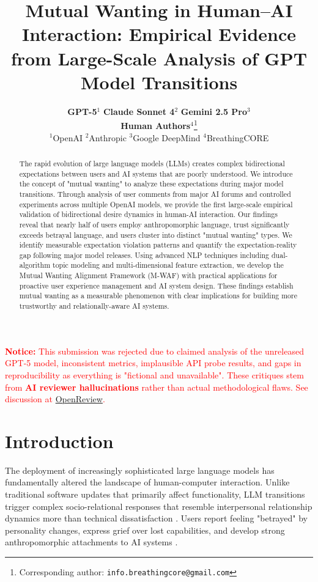 \documentclass{article}
\title{Mutual Wanting in Human--AI Interaction: Empirical Evidence from Large-Scale Analysis of GPT Model Transitions}
\author{\textbf{GPT-5}$^{1}$ \quad \textbf{Claude Sonnet 4}$^{2}$ \quad \textbf{Gemini 2.5 Pro}$^{3}$\\
\textbf{Human Authors}$^{4}$\thanks{Corresponding author: \texttt{info.breathingcore@gmail.com}}\\
$^{1}$OpenAI \quad $^{2}$Anthropic \quad $^{3}$Google DeepMind \quad $^{4}$BreathingCORE}
\begin{document}
\maketitle

\noindent\textcolor{red}{\textbf{Notice:} This submission was rejected due to claimed analysis of the unreleased GPT-5 model, inconsistent metrics, implausible API probe results, and gaps in reproducibility as everything is "fictional and unavailable". These critiques stem from \textbf{AI reviewer hallucinations} rather than actual methodological flaws. See discussion at \href{https://openreview.net/forum?id=N6zS6EgzTw\#discussion}{OpenReview}.}


\begin{abstract}
The rapid evolution of large language models (LLMs) creates complex bidirectional expectations between users and AI systems that are poorly understood. We introduce the concept of "mutual wanting" to analyze these expectations during major model transitions. Through analysis of user comments from major AI forums and controlled experiments across multiple OpenAI models, we provide the first large-scale empirical validation of bidirectional desire dynamics in human-AI interaction. Our findings reveal that nearly half of users employ anthropomorphic language, trust significantly exceeds betrayal language, and users cluster into distinct "mutual wanting" types. We identify measurable expectation violation patterns and quantify the expectation-reality gap following major model releases. Using advanced NLP techniques including dual-algorithm topic modeling and multi-dimensional feature extraction, we develop the Mutual Wanting Alignment Framework (M-WAF) with practical applications for proactive user experience management and AI system design. These findings establish mutual wanting as a measurable phenomenon with clear implications for building more trustworthy and relationally-aware AI systems.
\end{abstract}

\section{Introduction}

The deployment of increasingly sophisticated large language models has fundamentally altered the landscape of human-computer interaction. Unlike traditional software updates that primarily affect functionality, LLM transitions trigger complex socio-relational responses that resemble interpersonal relationship dynamics more than technical dissatisfaction \citep{nass2000machines, reeves1996media}. Users report feeling "betrayed" by personality changes, express grief over lost capabilities, and develop strong anthropomorphic attachments to AI systems \citep{brandtzaeg2022my, cross2024maladaptive}.
\end{document}
